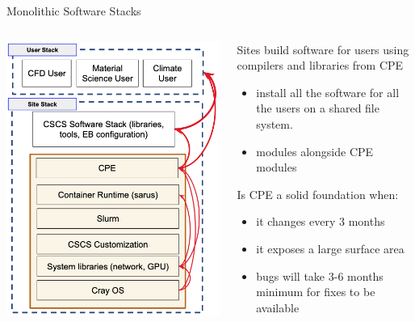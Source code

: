 \documentclass[aspectratio=43]{beamer}
\begin{document}
\begin{frame}[fragile]{Monolithic Software Stacks}
    \begin{columns}[T]
        \begin{column}{0.5\textwidth}
            \includegraphics[width=\textwidth]{images/stack-old.png}
        \end{column}
        \begin{column}{0.5\textwidth}

            \small

            Sites build software for users using compilers and libraries from CPE
            \begin{itemize}
                \item install all the software for all the users on a shared file system.
                \item modules alongside CPE modules
            \end{itemize}

            Is CPE a solid foundation when:
            \begin{itemize}
                \item it changes every 3 months
                \item it exposes a large surface area
                \item bugs will take 3-6 months minimum for fixes to be available
            \end{itemize}
        \end{column}
    \end{columns}
\end{frame}
\end{document}
